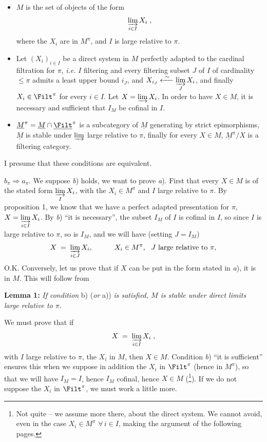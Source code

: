 \begin{itemize}
\item[\circled{a$_\pi$}] $M$ is the set of objects of the form
\[
\varinjlim_{i\in I} X_i \;,
\]
where the $X_i$ are in $M^\pi$, and $I$ is large relative to $\pi$.
\end{itemize}


\begin{itemize}
\item[\circled{b$_\pi$}] Let $(X_i)_{i\in I}$ be a direct system in $M$ perfectly adapted to the cardinal filtration for $\pi$, \textit{i.e.} $I$ filtering and every filtering subset $J$ of $I$ of cardinality $\le\pi$ admits a least upper bound $i_J$, and $X_{i_J}\xleftarrow{\ \sim\ }\varinjlim\limits_{J} X_i$, and finally $X_i\in\Filt^\pi$ for every $i\in I$. Let $X=\varinjlim X_i$. In order to have $X\in M$, it is necessary and sufficient that $I_M$ be cofinal in $I$.
\item[\circled{c$_\pi$}] $\underline{M}^\pi=\underline{M}\cap\underline{\Filt}^\pi$ is a subcategory of $\underline{M}$ generating by strict epimorphisms, $\underline{M}$ is stable under $\varinjlim$ large relative to $\pi$, finally for every $X\in M$, $\underline{M}^\pi/X$ is a filtering category.
\end{itemize}

I presume that these conditions are equivalent.

$b_\pi\Longrightarrow a_\pi$. We suppose \textit{b}) holds, we want to prove \textit{a}). First that every $X\in M$ is of the stated form $\varinjlim\limits_{I} X_i$, with the $X_i\in M^\pi$ and $I$ large relative to $\pi$. By proposition 1, we know that we have a perfect adapted presentation for $\pi$, $X=\varinjlim\limits_{i\in I} X_i$. By \textit{b}) ``it is necessary'', the subset $I_M$ of $I$ is cofinal in $I$, so since $I$ is large relative to $\pi$, so is $I_M$, and we will have (setting $J=I_M$)
\[
X \;=\; \varinjlim_{i\in J} X_i, \qquad\quad X_i\in M^\pi,\ \ J \text{ large relative to } \pi,
\]
O.K. Conversely, let us prove that if $X$ can be put in the form stated in \textit{a}), it is in $M$. This will follow from

\textbf{Lemma 1:} \textit{If condition} b) (\textit{or} a)) \textit{is satisfied, $M$ is stable under direct limits large relative to $\pi$.}

We must prove that if
\[
X \;=\; \varinjlim_{i\in I} X_i \;,
\]
with $I$ large relative to $\pi$, the $X_i$ in $M$, then $X\in M$. Condition \textit{b}) ``it is sufficient'' ensures this when we suppose in addition the $X_i$ in $\Filt^\pi$ (hence in $M^\pi$), so that we will have $I_M=I$, hence $I_M$ cofinal, hence $X\in M$ (\footnote[42]{Not quite – we assume more there, about the direct system. We cannot avoid, even in the case $X_i\in M^\pi$ $\forall\, i\in I$, making the argument of the following pages.}). If we do not suppose the $X_i$ in $\Filt^\pi$, we must work a little more.

